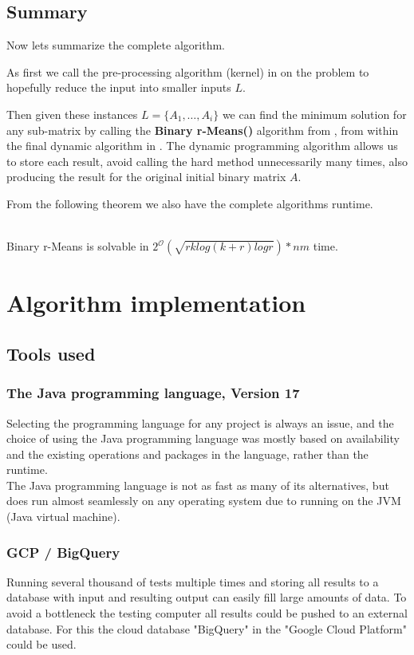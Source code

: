 \documentclass[a4paper]{article}
\begin{document}
\subsection{Summary}
Now lets summarize the complete algorithm. 

As first we call the pre-processing algorithm (kernel) in  
on the problem to hopefully reduce the input into smaller inputs $L$. 

Then given these instances $L = \{A_1, \dots, A_i\}$ we can find the minimum solution for any 
sub-matrix by calling the \textbf{Binary r-Means()} algorithm from , from within the final 
dynamic algorithm in . The dynamic programming algorithm allows us to store each result, avoid calling 
the hard method unnecessarily many times, also producing the result for the original initial binary matrix $A$.

From the following theorem we also have the complete algorithms runtime.
\begin{theoremth}{\cite[Theorem 5]{fomin_golovach_panolan_2020}}
    \\Binary r-Means is solvable in $2^\mathcal{O}(\sqrt{r k log(k+r) log r})* n m$ time.
\end{theoremth}

%
%
\newpage

\section{Algorithm implementation}
\label{sec:impl}
\subsection{Tools used}
\subsubsection{The Java programming language, Version 17}
Selecting the programming language for any project is always an issue, and the choice of using
the Java programming language was mostly based on availability and the existing operations
and packages in the language, rather than the runtime.
\\
The Java programming language is not as fast as many of its alternatives, but does run almost
seamlessly on any operating system due to running on the JVM (Java virtual machine).

\subsubsection{GCP / BigQuery}
\label{sec:bigquery}
Running several thousand of tests multiple times and storing all results to a database with
input and resulting output can easily fill large amounts of data. To avoid a bottleneck the
testing computer all results could be pushed to an external database. For this the cloud database
"BigQuery" in the "Google Cloud Platform" could be used.
\end{document}
